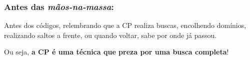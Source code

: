 \documentclass{beamer}
\begin{document}
\begin{frame}[fragile]

\frametitle{Antes das {\em mãos-na-massa}:}
\begin{center}
{\large 
    Antes dos códigos, relembrando  que a CP realiza buscas, encolhendo domínios, realizando saltos a frente, ou quando voltar, sabe por onde já passou. }
    
    \vspace{1cm}
    
{\large  Ou seja, {\bf a CP é uma técnica que preza por uma busca completa}!}
    
\end{center}


\end{frame}
\end{document}
